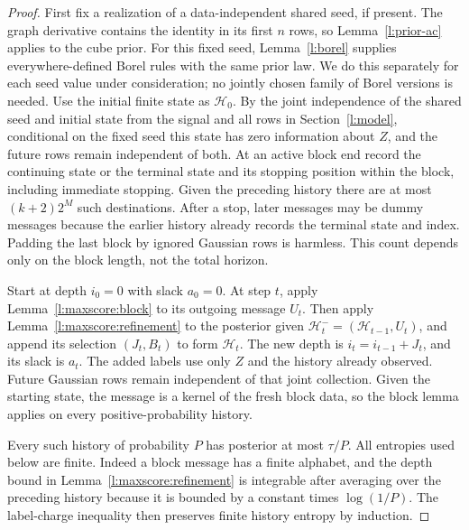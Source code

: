 \begin{proof}
First fix a realization of a data-independent shared seed, if present.
The graph derivative contains the identity in its first \(n\) rows, so
Lemma~\ref{l:prior-ac} applies to the cube prior.  For this fixed seed,
Lemma~\ref{l:borel} supplies everywhere-defined Borel rules with the
same prior law.  We do this separately for each seed value under
consideration; no jointly chosen family of Borel versions is needed.
Use the initial finite state as \(\mathcal H_0\).  By the joint
independence of the shared seed and initial state from the signal and
all rows in Section~\ref{l:model}, conditional on the fixed seed this
state has zero information about \(Z\), and the future rows remain
independent of both.  At an active block end record
the continuing state or the terminal state and its stopping position
within the block, including immediate stopping.  Given the preceding
history there are at most \((k+2)2^M\) such destinations.
After a stop, later messages may be dummy messages because the earlier
history already records the terminal state and index.  Padding the last
block by ignored Gaussian rows is harmless.  This count depends only on
the block length, not the total horizon.

Start at depth \(i_0=0\) with slack \(a_0=0\).
At step \(t\), apply Lemma~\ref{l:maxscore:block} to its outgoing
message \(U_t\).  Then apply Lemma~\ref{l:maxscore:refinement}
to the posterior given
\(\mathcal H_t^-=(\mathcal H_{t-1},U_t)\), and append its
selection \((J_t,B_t)\) to form \(\mathcal H_t\).
The new depth is \(i_t=i_{t-1}+J_t\), and its slack is \(a_t\).
The added labels use only \(Z\) and the history already observed.
Future Gaussian rows remain independent of that joint collection.
Given the starting state, the message is a kernel of the fresh block
data, so the block lemma applies on every positive-probability history.

Every such history of probability \(P\) has posterior at most
\(\tau/P\).  All entropies used below are finite.  Indeed a block
message has a finite alphabet, and the depth bound in
Lemma~\ref{l:maxscore:refinement} is integrable after averaging over
the preceding history because it is bounded by a constant times
\(\log(1/P)\).  The label-charge inequality then preserves finite
history entropy by induction.


\end{proof}
